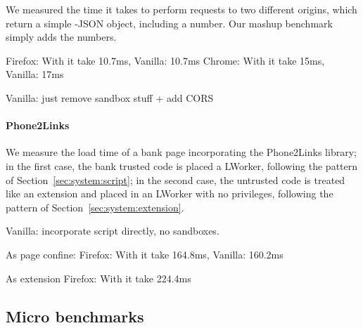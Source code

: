 We measured the time it takes to perform requests to two different origins,
which return a simple -JSON object, including a number.
%
Our mashup benchmark simply adds the numbers.


Firefox: With \sys{} it take 10.7ms, Vanilla:  10.7ms
Chrome: With \sys{} it take 15ms, Vanilla:  17ms

Vanilla: just remove sandbox stuff + add CORS

\paragraph{Phone2Links}

We measure the load time of a bank page incorporating the Phone2Links library;
in the first case, the bank trusted code is placed a LWorker, following the
pattern of Section~\ref{sec:system:script}; in the second case, the untrusted
code is treated like an extension and placed in an LWorker with no privileges,
following the pattern of Section~\ref{sec:system:extension}.

Vanilla: incorporate script directly, no sandboxes.


As page confine:
Firefox: With \sys{} it take 164.8ms, Vanilla:  160.2ms

As extension
Firefox: With \sys{} it take 224.4ms

\subsection{Micro benchmarks}
\label{sec:eval:micro}

\newcommand*\rot{\rotatebox{90}}

